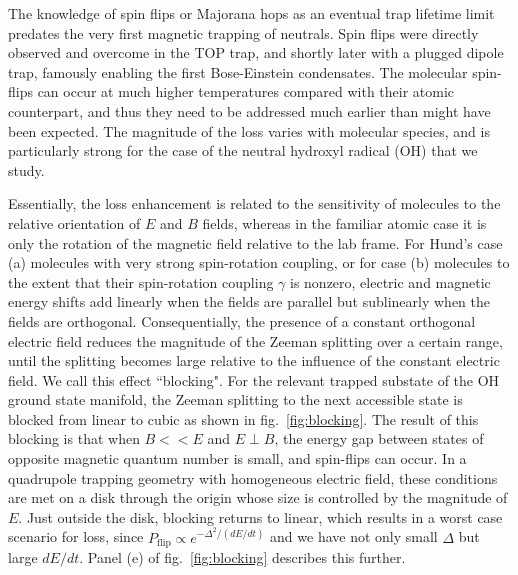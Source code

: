 \documentclass[%
 reprint,
 amsmath,amssymb,
 aps,
prl,
]{revtex4-1}
\begin{document}
The knowledge of spin flips or Majorana hops as an eventual trap lifetime limit predates the very first magnetic trapping of neutrals\cite{Migdall1985}. Spin flips were directly observed and overcome in the TOP trap\cite{Petrich1995}, and shortly later with a plugged dipole trap\cite{Davis1995}, famously enabling the first Bose-Einstein condensates. The molecular spin-flips can occur at much higher temperatures compared with their atomic counterpart, and thus they need to be addressed much earlier than might have been expected. The magnitude of the loss varies with molecular species, and is particularly strong for the case of the neutral hydroxyl radical (OH) that we study. 

Essentially, the loss enhancement is related to the sensitivity of molecules to the relative orientation of $E$ and $B$ fields, whereas in the familiar atomic case it is only the rotation of the magnetic field relative to the lab frame. For Hund's case (a) molecules with very strong spin-rotation coupling, or for case (b) molecules to the extent that their spin-rotation coupling $\gamma$ is nonzero, electric and magnetic energy shifts add linearly when the fields are parallel but sublinearly when the fields are orthogonal. Consequentially, the presence of a constant orthogonal electric field reduces the magnitude of the Zeeman splitting over a certain range, until the splitting becomes large relative to the influence of the constant electric field. We call this effect ``blocking". For the relevant trapped substate of the OH ground state manifold, the Zeeman splitting to the next accessible state is blocked from linear to cubic as shown in fig.~\ref{fig:blocking}.  The result of this blocking is that when $B<<E$ and $E\!\perp\! B$, the energy gap between states of opposite magnetic quantum number is small, and spin-flips can occur. In a quadrupole trapping geometry with homogeneous electric field, these conditions are met on a disk through the origin whose size is controlled by the magnitude of $E$. Just outside the disk, blocking returns to linear, which results in a worst case scenario for loss, since $P_{\text{flip}}\propto e^{-\Delta^2/(dE/dt)}$ and we have not only small $\Delta$ but large $dE/dt$. Panel (e) of fig.~\ref{fig:blocking} describes this further.
\end{document}
